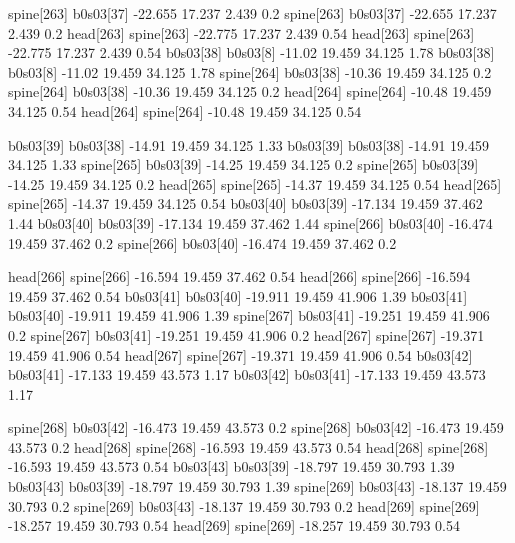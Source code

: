 spine[263]    b0s03[37]    -22.655    17.237    2.439    0.2
spine[263]    b0s03[37]    -22.655    17.237    2.439    0.2
head[263]    spine[263]    -22.775    17.237    2.439    0.54
head[263]    spine[263]    -22.775    17.237    2.439    0.54
b0s03[38]    b0s03[8]    -11.02    19.459    34.125    1.78
b0s03[38]    b0s03[8]    -11.02    19.459    34.125    1.78
spine[264]    b0s03[38]    -10.36    19.459    34.125    0.2
spine[264]    b0s03[38]    -10.36    19.459    34.125    0.2
head[264]    spine[264]    -10.48    19.459    34.125    0.54
head[264]    spine[264]    -10.48    19.459    34.125    0.54


b0s03[39]    b0s03[38]    -14.91    19.459    34.125    1.33
b0s03[39]    b0s03[38]    -14.91    19.459    34.125    1.33
spine[265]    b0s03[39]    -14.25    19.459    34.125    0.2
spine[265]    b0s03[39]    -14.25    19.459    34.125    0.2
head[265]    spine[265]    -14.37    19.459    34.125    0.54
head[265]    spine[265]    -14.37    19.459    34.125    0.54
b0s03[40]    b0s03[39]    -17.134    19.459    37.462    1.44
b0s03[40]    b0s03[39]    -17.134    19.459    37.462    1.44
spine[266]    b0s03[40]    -16.474    19.459    37.462    0.2
spine[266]    b0s03[40]    -16.474    19.459    37.462    0.2


head[266]    spine[266]    -16.594    19.459    37.462    0.54
head[266]    spine[266]    -16.594    19.459    37.462    0.54
b0s03[41]    b0s03[40]    -19.911    19.459    41.906    1.39
b0s03[41]    b0s03[40]    -19.911    19.459    41.906    1.39
spine[267]    b0s03[41]    -19.251    19.459    41.906    0.2
spine[267]    b0s03[41]    -19.251    19.459    41.906    0.2
head[267]    spine[267]    -19.371    19.459    41.906    0.54
head[267]    spine[267]    -19.371    19.459    41.906    0.54
b0s03[42]    b0s03[41]    -17.133    19.459    43.573    1.17
b0s03[42]    b0s03[41]    -17.133    19.459    43.573    1.17


spine[268]    b0s03[42]    -16.473    19.459    43.573    0.2
spine[268]    b0s03[42]    -16.473    19.459    43.573    0.2
head[268]    spine[268]    -16.593    19.459    43.573    0.54
head[268]    spine[268]    -16.593    19.459    43.573    0.54
b0s03[43]    b0s03[39]    -18.797    19.459    30.793    1.39
b0s03[43]    b0s03[39]    -18.797    19.459    30.793    1.39
spine[269]    b0s03[43]    -18.137    19.459    30.793    0.2
spine[269]    b0s03[43]    -18.137    19.459    30.793    0.2
head[269]    spine[269]    -18.257    19.459    30.793    0.54
head[269]    spine[269]    -18.257    19.459    30.793    0.54


